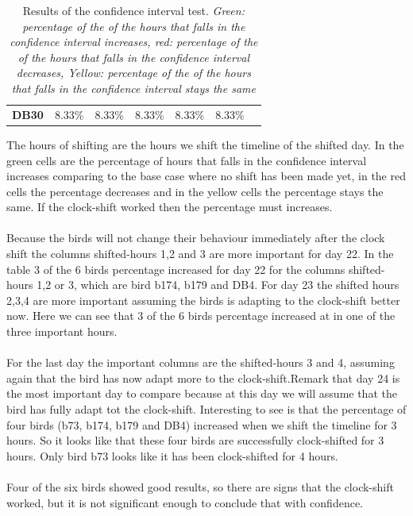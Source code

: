 \documentclass[a4paper]{article}
\begin{document}
\begin{table}[H]
{\begin{tabular}{|l|l|l|l|l|l|lllll}
\textbf{DB30} & \cellcolor[HTML]{BBDAFF}8.33\% & \cellcolor[HTML]{FFFE65}8.33\% & \cellcolor[HTML]{FFFE65}8.33\% & \cellcolor[HTML]{FFFE65}8.33\% & \cellcolor[HTML]{FFFE65}8.33\% & \multicolumn{5}{l}{\multirow{}{}{\cellcolor[HTML]{FFFFFF}}} \\ \cline{1-6}
\end{tabular}
}
\caption{Results of the confidence interval test. \small{\emph{Green: percentage of the of the hours that falls in the confidence interval increases, 
red: percentage of the of the hours that falls in the confidence interval decreases, Yellow: percentage of the of the hours that falls in the confidence interval stays the same }}}
\label{my-label}
\end{table}
The hours of shifting are the hours we shift the timeline of the shifted day. In the green cells are the percentage of hours that falls in the confidence interval increases comparing to the base case where no shift has been made yet, in the red cells the percentage decreases and in the yellow cells the percentage stays the same. If the clock-shift worked then the percentage must increases.\\\\
Because the birds will not change their behaviour immediately after the clock shift the columns shifted-hours 1,2 and 3 are more important for day 22. In the table 3 of the 6 birds percentage increased for day 22 for the columns shifted-hours 1,2 or 3, which are bird b174, b179 and DB4. For day 23 the shifted hours 2,3,4 are more important assuming the birds is adapting  to the clock-shift better now. Here we can see that 3 of the 6 birds percentage increased at in one of the three important hours.\\\\For the last day the important columns are the shifted-hours 3 and 4, assuming again that the bird has now adapt more to the clock-shift.Remark that day 24 is the most important day to compare because at this day we will assume that the bird has fully adapt tot the clock-shift. Interesting to see is that the percentage of four birds (b73, b174, b179 and DB4) increased when we shift the timeline for 3 hours. So it looks like that these four birds are successfully clock-shifted for 3 hours. Only bird b73 looks like it has been clock-shifted for 4 hours.\\\\
Four of the six birds showed good results, so there are signs that the clock-shift worked, but it is not significant enough to conclude that with confidence. 
\end{document}

